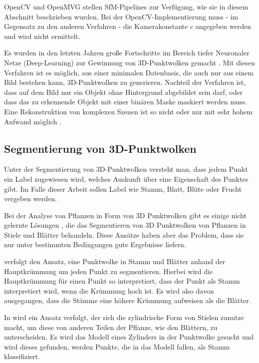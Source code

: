 \documentclass[12pt,titlepage, twoside]{article}
\begin{document}
OpenCV und OpenMVG stellen SfM-Pipelines zur Verfügung, wie sie in diesem Abschnitt beschrieben wurden. 
Bei der OpenCV-Implementierung muss - im Gegensatz zu den anderen Verfahren - die Kamerakonstante $c$ angegeben werden und wird nicht ermittelt.

Es wurden in den letzten Jahren große Fortschritte im Bereich tiefer Neuronaler Netze (Deep-Learning) \cite{lecun2015deep} zur Gewinnung von 3D-Punktwolken gemacht \cite{fan2016point} \cite{tatarchenko2017octree} \cite{wang2018pixel2mesh}. 
Mit diesen Verfahren ist es möglich, aus einer minimalen Datenbasis, die auch nur aus einem Bild bestehen kann, 3D-Punktwolken zu generieren.
Nachteil der Verfahren ist, dass auf dem Bild nur ein Objekt ohne Hintergrund abgebildet sein darf, oder dass das zu erkennende Objekt mit einer binären Maske maskiert werden muss.
Eine Rekonstruktion von komplexen Szenen ist so nicht oder nur mit sehr hohem Aufwand möglich \cite{rs11222644}. %

\subsection{Segmentierung von 3D-Punktwolken}
\label{sec:stand:segmentierung}

Unter der Segmentierung von 3D-Punktwolken versteht man, dass jedem Punkt ein Label zugewiesen wird, welches Auskunft über eine Eigenschaft des Punktes gibt.
Im Falle dieser Arbeit sollen Label wie \grqq{}Stamm\grqq{}, \grqq{}Blatt\grqq{}, \grqq{}Blüte\grqq{} oder \grqq{}Frucht\grqq{} vergeben werden.

Bei der Analyse von Pflanzen in Form von 3D Punktwolken gibt es einige nicht gelernte Lösungen \cite{ThreeBasics} \cite{ModelBased}, die das Segmentieren von 3D Punktwolken von Pflanzen in Stiele und Blätter behandeln. 
Diese Ansätze haben aber das Problem, dass sie nur unter bestimmten Bedingungen gute Ergebnisse liefern.

\cite{ThreeBasics} verfolgt den Ansatz, eine Punktwolke in Stamm und Blätter anhand der Hauptkrümmung um jeden Punkt zu segmentieren. 
Hierbei wird die Hauptkrümmung für einen Punkt so interpretiert, dass der Punkt als Stamm interpretiert wird, wenn die Krümmung hoch ist. 
Es wird also davon ausgegangen, dass die Stämme eine höhere Krümmung aufweisen als die Blätter. 

In \cite{ModelBased} wird ein Ansatz verfolgt, der sich die zylindrische Form von Stielen zunutze macht, um diese von anderen Teilen der Pflanze, wie den Blättern, zu unterscheiden. 
Es wird das Modell eines Zylinders in der Punktwolke gesucht und wird dieses gefunden, werden Punkte, die in das Modell fallen, als Stamm klassifiziert.
\end{document}
